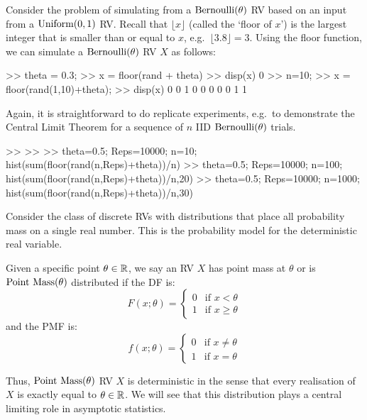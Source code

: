 \begin{simulation}[$\bernoulli(\theta)$]\label{SIM:Bernoulli}
Consider the problem of simulating from a $\bernoulli(\theta)$ RV based on an input from  a $\mbox{{\rm Uniform}}(0,1)$ RV.  Recall that $\lfloor x \rfloor$ (called the `floor of $x$') is the largest integer that is smaller than or equal to $x$, e.g.~$\lfloor 3.8 \rfloor = 3$.  Using the floor function, we can simulate a $\bernoulli(\theta)$ RV $X$ as follows:
\begin{VrbM}
>>  theta = 0.3;		%
>> x = floor(rand + theta)	%
>> disp(x) %
     0
>> n=10;  %
>> x = floor(rand(1,10)+theta); %
>> disp(x) %
     0     0     1     0     0     0     0     0     1     1
\end{VrbM}
\end{simulation}
Again, it is straightforward to do replicate experiments, e.g.~to demonstrate the Central Limit Theorem for a sequence of $n$ IID $\bernoulli(\theta)$ trials.
\begin{VrbM}
>> %
>> %
>> theta=0.5; Reps=10000; n=10; hist(sum(floor(rand(n,Reps)+theta))/n)
>> theta=0.5; Reps=10000; n=100; hist(sum(floor(rand(n,Reps)+theta))/n,20)
>> theta=0.5; Reps=10000; n=1000; hist(sum(floor(rand(n,Reps)+theta))/n,30)
\end{VrbM}

Consider the class of discrete RVs with distributions that place all probability mass on a single real number.  This is the probability model for the  deterministic real variable.
\begin{model}[$\pointmass(\theta)$]
Given a specific point $\theta \in \mathbb{R}$, we say an RV $X$ has point mass at $\theta$ or is $\pointmass(\theta)$ distributed if the DF is:
\begin{equation}\label{E:PointMasscdf}
F(x;\theta) =
\begin{cases}
0 & \text{if $x < \theta$} \\
1 & \text{if $x \geq \theta$}
\end{cases}
\end{equation}
and the PMF is:
\begin{equation}
f(x;\theta) =
\begin{cases}
0 & \text{if  $x \neq \theta$} \\
1 & \text{if $x = \theta$}
\end{cases}
\end{equation}
\end{model}
Thus, $\pointmass(\theta)$ RV $X$ is deterministic in the sense that every realisation of $X$ is exactly equal to $\theta \in \mathbb{R}$.  We will see that this distribution plays a central limiting role in asymptotic statistics.
